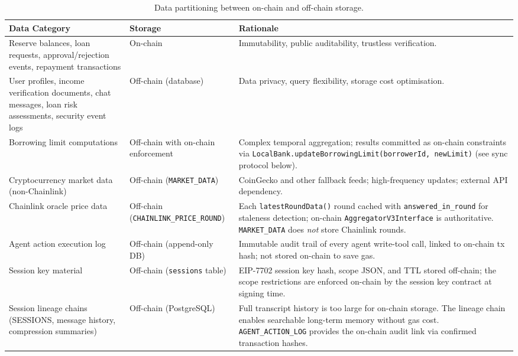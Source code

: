 \documentclass[12pt,a4paper]{article}
\newcommand{\tableheadcolor}{\rowcolor{TableHeadBg}}
\begin{document}
\begin{table}[H]
\centering
\caption[Data partitioning between on-chain and off-chain storage]{Data partitioning between on-chain and off-chain storage.}
\label{tab:data-partitioning}
\begin{tabular}{p{4.5cm}p{2.5cm}p{6.5cm}}
\toprule
\tableheadcolor
\textbf{Data Category} & \textbf{Storage} & \textbf{Rationale} \\
\midrule
Reserve balances, loan requests, approval/rejection events, repayment transactions & On-chain & Immutability, public auditability, trustless verification. \\
User profiles, income verification documents, chat messages, loan risk assessments, security event logs & Off-chain (database) & Data privacy, query flexibility, storage cost optimisation. \\
Borrowing limit computations & Off-chain with on-chain enforcement & Complex temporal aggregation; results committed as on-chain constraints via \texttt{LocalBank.updateBorrowingLimit(borrowerId, newLimit)} (see sync protocol below). \\
Cryptocurrency market data (non-Chainlink) & Off-chain (\texttt{MARKET\_DATA}) & CoinGecko and other fallback feeds; high-frequency updates; external API dependency. \\
Chainlink oracle price data & Off-chain (\texttt{CHAINLINK\_PRICE\_ROUND}) & Each \texttt{latestRoundData()} round cached with \texttt{answered\_in\_round} for staleness detection; on-chain \texttt{AggregatorV3Interface} is authoritative. \texttt{MARKET\_DATA} does \textit{not} store Chainlink rounds. \\
Agent action execution log & Off-chain (append-only DB) & Immutable audit trail of every agent write-tool call, linked to on-chain tx hash; not stored on-chain to save gas. \\
Session key material & Off-chain (\texttt{sessions} table) & EIP-7702 session key hash, scope JSON, and TTL stored off-chain; the scope restrictions are enforced on-chain by the session key contract at signing time. \\
Session lineage chains (SESSIONS, message history, compression summaries) & Off-chain (PostgreSQL) & Full transcript history is too large for on-chain storage. The lineage chain enables searchable long-term memory without gas cost. \texttt{AGENT\_ACTION\_LOG} provides the on-chain audit link via confirmed transaction hashes. \\
\bottomrule
\end{tabular}
\end{table}
\end{document}
